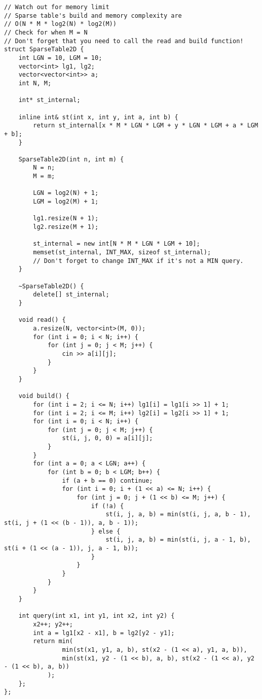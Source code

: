 \begin{lstlisting}
// Watch out for memory limit
// Sparse table's build and memory complexity are
// O(N * M * log2(N) * log2(M))
// Check for when M = N
// Don't forget that you need to call the read and build function!
struct SparseTable2D {
    int LGN = 10, LGM = 10;
    vector<int> lg1, lg2;
    vector<vector<int>> a;
    int N, M;

    int* st_internal;

    inline int& st(int x, int y, int a, int b) {
        return st_internal[x * M * LGN * LGM + y * LGN * LGM + a * LGM + b];
    }

    SparseTable2D(int n, int m) {
        N = n;
        M = m;

        LGN = log2(N) + 1;
        LGM = log2(M) + 1;
        
        lg1.resize(N + 1);
        lg2.resize(M + 1);

        st_internal = new int[N * M * LGN * LGM + 10];
        memset(st_internal, INT_MAX, sizeof st_internal);
        // Don't forget to change INT_MAX if it's not a MIN query.
    }

    ~SparseTable2D() {
        delete[] st_internal;
    }

    void read() {
        a.resize(N, vector<int>(M, 0));
        for (int i = 0; i < N; i++) {
            for (int j = 0; j < M; j++) {
                cin >> a[i][j];
            }
        }
    }

    void build() {
        for (int i = 2; i <= N; i++) lg1[i] = lg1[i >> 1] + 1;
        for (int i = 2; i <= M; i++) lg2[i] = lg2[i >> 1] + 1;
        for (int i = 0; i < N; i++) {
            for (int j = 0; j < M; j++) {
                st(i, j, 0, 0) = a[i][j];
            }
        }
        for (int a = 0; a < LGN; a++) {
            for (int b = 0; b < LGM; b++) {
                if (a + b == 0) continue;
                for (int i = 0; i + (1 << a) <= N; i++) {
                    for (int j = 0; j + (1 << b) <= M; j++) {
                        if (!a) {
                            st(i, j, a, b) = min(st(i, j, a, b - 1), st(i, j + (1 << (b - 1)), a, b - 1));
                        } else {
                            st(i, j, a, b) = min(st(i, j, a - 1, b), st(i + (1 << (a - 1)), j, a - 1, b));
                        }
                    }
                }
            }
        }
    }

    int query(int x1, int y1, int x2, int y2) {
        x2++; y2++;
        int a = lg1[x2 - x1], b = lg2[y2 - y1];
        return min(
                min(st(x1, y1, a, b), st(x2 - (1 << a), y1, a, b)),
                min(st(x1, y2 - (1 << b), a, b), st(x2 - (1 << a), y2 - (1 << b), a, b))
            );
    };
};
\end{lstlisting}

